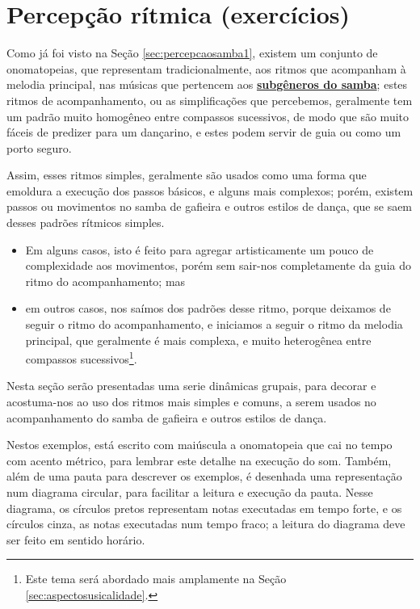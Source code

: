 \section{Percepção rítmica (exercícios)}



Como já foi visto na Seção \ref{sec:percepcaosamba1},
existem um conjunto de onomatopeias, que representam  tradicionalmente,
aos ritmos  que acompanham à melodia principal, 
nas músicas que pertencem aos \hyperref[sec:FamiliaSamba]{\textbf{subgêneros do samba}};
estes ritmos de acompanhamento, ou as simplificações que percebemos, 
geralmente tem um padrão muito homogêneo entre compassos sucessivos,
de modo que são muito fáceis de predizer para um dançarino, 
e estes podem servir de guia ou como um porto seguro.

Assim, esses ritmos simples, geralmente são usados como uma forma que emoldura a execução dos passos básicos,
e alguns mais complexos;
porém, existem passos ou movimentos no samba de gafieira e outros estilos de dança,
que se saem desses padrões rítmicos simples. 
\begin{itemize}
\item Em alguns casos,
isto é feito para agregar artisticamente um pouco de complexidade aos movimentos,
porém sem sair-nos completamente da guia do ritmo do acompanhamento; mas 
\item em outros casos, nos saímos dos padrões desse ritmo, 
porque deixamos de seguir o ritmo do acompanhamento,
e iniciamos a seguir o ritmo da melodia principal, que geralmente é mais complexa,
e muito heterogênea entre compassos sucessivos\footnote{Este 
tema será abordado mais amplamente na Seção \ref{sec:aspectosusicalidade}.}. 
\end{itemize}


Nesta seção serão presentadas uma serie dinâmicas grupais, 
para decorar e acostuma-nos ao uso dos ritmos mais simples e comuns, 
a serem usados no acompanhamento do samba de gafieira e outros estilos de dança.

Nestos exemplos, está escrito com maiúscula a onomatopeia 
que cai no tempo com acento métrico, para lembrar este detalhe na execução do som. 
Também, além de uma pauta para descrever os exemplos, 
é desenhada uma representação num diagrama circular,
para facilitar a leitura e execução da pauta.
Nesse diagrama, os círculos pretos representam notas executadas em tempo forte,
e os círculos cinza, as notas executadas num tempo fraco;
a leitura do diagrama deve ser feito em sentido horário.  

